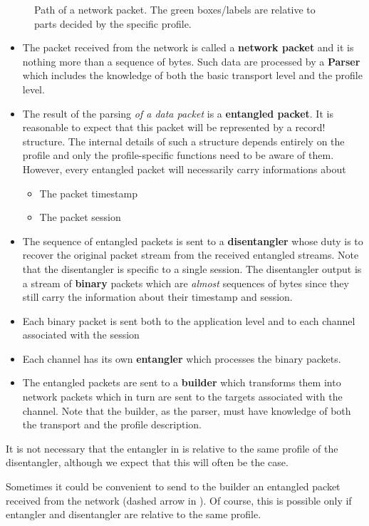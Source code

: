 \documentclass[a4paper]{medusabook}
\begin{document}
\begin{figure}
\centerline{}
\caption{Path of a network packet.  The green boxes/labels are
  relative to parts decided by the specific profile.
\label{fig:profile}}
\end{figure}
%

\begin{itemize}
\item
The packet received from the network is called a \textbf{network packet}
and it is nothing more than a sequence of bytes.  Such data are
processed by a \textbf{Parser} which includes the knowledge of both the
basic transport level and the profile level.
\item
The result of the parsing \emph{of a data packet} is a \textbf{entangled
  packet}. It is reasonable to expect that this packet will be
  represented by a \ttt record! structure.  The internal details of
  such a structure depends entirely on the profile and only the
  profile-specific functions need to be aware of them.  However, every
  entangled packet will necessarily carry informations about
\begin{itemize}
\item
The packet timestamp
\item
The packet session
\end{itemize}
%
\item
The sequence of entangled packets is sent to a \textbf{disentangler} whose
duty is to recover the original packet stream from the received
entangled streams. Note that the disentangler is specific to a single
session.   The disentangler output is a stream of \textbf{binary} packets
which are \emph{almost} sequences of bytes since they still carry the
information about their timestamp and session.
\item
Each binary packet is sent both to the application level and to each
channel associated with the session
\item
Each channel has its own \textbf{entangler} which processes the binary
packets.  
\item
The entangled packets are sent to a \textbf{builder} which transforms
them into network packets which in turn are sent to the targets
associated with the channel.  Note that the builder, as the parser,
must have knowledge of both the transport and the profile description.
\end{itemize}
%
\begin{commento}
\label{commento:0.0;overview}
It is not necessary that the entangler in  is relative
to the same profile of the disentangler, although we expect that this
will often be the case.
\end{commento}
%
\begin{commento}
\label{commento:0.1;overview}
Sometimes it could be convenient to send to the builder an entangled
packet received from the network (dashed arrow in ).  Of
course, this is possible only if entangler and disentangler are
relative to the same profile.
\end{commento}
%
\end{document}
